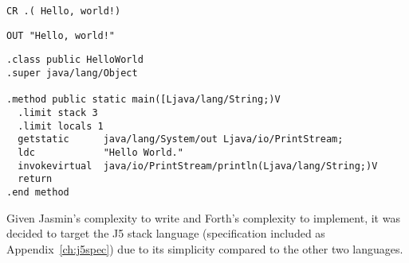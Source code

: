\noindent\begin{minipage}{0.5\textwidth}
\begin{lstlisting}[caption={Forth ASM},label={lst:forthasm}]
CR .( Hello, world!)
\end{lstlisting}
\end{minipage}%
\noindent\begin{minipage}{0.5\textwidth}
\begin{lstlisting}[caption={J5 ASM},label={lst:j5asm}]
OUT "Hello, world!"
\end{lstlisting}
\end{minipage}
\begin{minipage}{\textwidth}
\begin{lstlisting}[caption={Jasmin ASM}, label={lst:jasminasm}]
.class public HelloWorld
.super java/lang/Object

.method public static main([Ljava/lang/String;)V
  .limit stack 3
  .limit locals 1
  getstatic      java/lang/System/out Ljava/io/PrintStream;
  ldc            "Hello World."
  invokevirtual  java/io/PrintStream/println(Ljava/lang/String;)V
  return
.end method
\end{lstlisting}
\end{minipage}

Given Jasmin's complexity to write and Forth's complexity to implement, it was
decided to target the J5 stack language (specification included as
Appendix~\ref{ch:j5spec}) due to its simplicity compared to the other two
languages.
